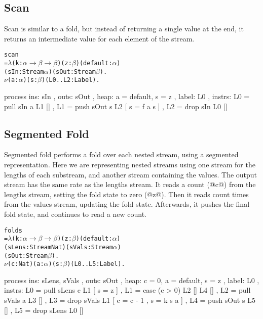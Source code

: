 \subsection{Scan}
Scan is similar to a fold, but instead of returning a single value at the end, it returns an intermediate value for each element of the stream.

\begin{alltt}
scan 
 =  \(\lambda\) (k : \(\alpha \to \beta \to \beta\)) (z : \(\beta\)) (default : \(\alpha\))
      (sIn: Stream \(\alpha\)) (sOut: Stream \(\beta\)).
    \(\nu\) (a: \(\alpha\)) (s : \(\beta\)) (L0..L2: Label).
\end{alltt}
\begin{code}
    process
    { ins:    { sIn  }
    , outs:   { sOut }
    , heap:   { a = default, s = z }
    , label:  L0
    , instrs: { L0 = pull sIn  a   L1 []
              , L1 = push sOut s   L2 [ s = f a s ]
              , L2 = drop sIn      L0 [] } }
\end{code}


\subsection{Segmented Fold}
Segmented fold performs a fold over each nested stream, using a segmented representation.
Here we are representing nested streams using one stream for the lengths of each substream, and another stream containing the values.
The output stream has the same rate as the lengths stream.
It reads a count (@c@) from the lengths stream, setting the fold state to zero (@z@).
Then it reads count times from the values stream, updating the fold state.
Afterwards, it pushes the final fold state, and continues to read a new count.

\begin{alltt}
folds 
 =  \(\lambda\) (k : \(\alpha \to \beta \to \beta\)) (z : \(\beta\)) (default : \(\alpha\))
      (sLens: Stream Nat) (sVals: Stream \(\alpha\))
      (sOut:  Stream \(\beta\)).
    \(\nu\) (c : Nat) (a: \(\alpha\)) (s : \(\beta\)) (L0..L5: Label).
\end{alltt}
\begin{code}
    process
    { ins:    { sLens, sVals }
    , outs:   { sOut }
    , heap:   { c = 0, a = default, s = z }
    , label:  L0
    , instrs: { L0 = pull sLens c   L1 [ s = z ]
              , L1 = case (c > 0)   L2 []  L4 []
              , L2 = pull sVals a   L3 []
              , L3 = drop sVals     L1 [ c = c - 1
                                       , s = k s a ]
              , L4 = push sOut  s   L5 []
              , L5 = drop sLens     L0 [] } }
\end{code}


